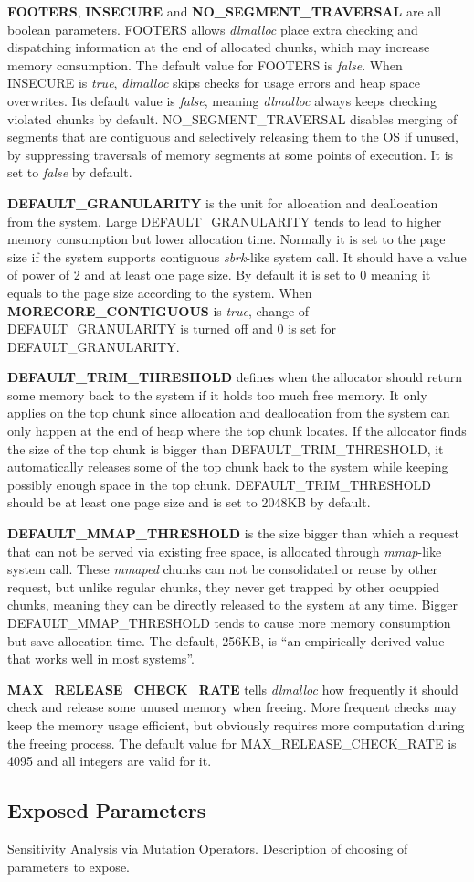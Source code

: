 \textbf{FOOTERS}, \textbf{INSECURE} and \textbf{NO\_SEGMENT\_TRAVERSAL} are all boolean parameters. FOOTERS allows \emph{dlmalloc} place extra checking and dispatching information at the end of allocated chunks, which may increase memory consumption. The default value for FOOTERS is \emph{false}. When INSECURE is \emph{true}, \emph{dlmalloc} skips checks for usage errors and heap space overwrites. Its default value is \emph{false}, meaning \emph{dlmalloc} always keeps checking violated chunks by default. NO\_SEGMENT\_TRAVERSAL disables merging of segments that are contiguous and selectively releasing them to the OS if unused, by suppressing traversals of memory segments at some points of execution. It is set to \emph{false} by default. 

\textbf{DEFAULT\_GRANULARITY} is the unit for allocation and deallocation from the system. Large DEFAULT\_GRANULARITY tends to lead to higher memory consumption but lower allocation time. Normally it is set to the page size if the system supports contiguous \emph{sbrk}-like system call. It should have a value of power of 2 and at least one page size. By default it is set to 0 meaning it equals to the page size according to the system. When \textbf{MORECORE\_CONTIGUOUS} is \emph{true}, change of DEFAULT\_GRANULARITY is turned off and 0 is set for DEFAULT\_GRANULARITY.

\textbf{DEFAULT\_TRIM\_THRESHOLD} defines when the allocator should return some memory back to the system if it holds too much free memory. It only applies on the top chunk since allocation and deallocation from the system can only happen at the end of heap where the top chunk locates. If the allocator finds the size of the top chunk is bigger than DEFAULT\_TRIM\_THRESHOLD, it automatically releases some of the top chunk back to the system while keeping possibly enough space in the top chunk. DEFAULT\_TRIM\_THRESHOLD should be at least one page size and is set to 2048KB by default. 

\textbf{DEFAULT\_MMAP\_THRESHOLD} is the size bigger than which a request that can not be served via existing free space, is allocated through \emph{mmap}-like system call. These \emph{mmaped} chunks can not be consolidated or reuse by other request, but unlike regular chunks, they never get trapped by other ocuppied chunks, meaning they can be directly released to the system at any time. Bigger DEFAULT\_MMAP\_THRESHOLD tends to cause more memory consumption but save allocation time. The default, 256KB, is ``an empirically derived value that works well in most systems''.

\textbf{MAX\_RELEASE\_CHECK\_RATE} tells \emph{dlmalloc} how frequently it should check and release some unused memory when freeing. More frequent checks may keep the memory usage efficient, but obviously requires more computation during the freeing process. The default value for MAX\_RELEASE\_CHECK\_RATE is 4095 and all integers are valid for it. 
\subsection{Exposed Parameters}
Sensitivity Analysis via Mutation Operators. Description of choosing of parameters to expose.

